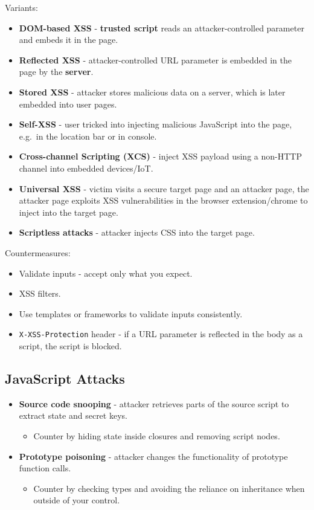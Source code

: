 \documentclass[11pt]{article}
\begin{document}
Variants:
\begin{itemize}
  \item \textbf{DOM-based XSS} - \textbf{trusted script} reads an attacker-controlled parameter and embeds it in the page.
  \item \textbf{Reflected XSS} - attacker-controlled URL parameter is embedded in the page by the \textbf{server}.
  \item \textbf{Stored XSS} - attacker stores malicious data on a server, which is later embedded into user pages.
  \item \textbf{Self-XSS} - user tricked into injecting malicious JavaScript into the page, e.g.\ in the location bar or in console.
  \item \textbf{Cross-channel Scripting (XCS)} - inject XSS payload using a non-HTTP channel into embedded devices/IoT.
  \item \textbf{Universal XSS} - victim visits a secure target page and an attacker page, the attacker page exploits XSS vulnerabilities in the browser extension/chrome to inject into the target page.
  \item \textbf{Scriptless attacks} - attacker injects CSS into the target page.
\end{itemize}

Countermeasures:
\begin{itemize}
  \item Validate inputs - accept only what you expect.
  \item XSS filters.
  \item Use templates or frameworks to validate inputs consistently.
  \item \texttt{X-XSS-Protection} header - if a URL parameter is reflected in the body as a script, the script is blocked.
\end{itemize}

\subsection{JavaScript Attacks}
\begin{itemize}
  \item \textbf{Source code snooping} - attacker retrieves parts of the source script to extract state and secret keys.
    \begin{itemize}
      \item Counter by hiding state inside closures and removing script nodes.
    \end{itemize}
  \item \textbf{Prototype poisoning} - attacker changes the functionality of prototype function calls.
    \begin{itemize}
      \item Counter by checking types and avoiding the reliance on inheritance when outside of your control.
    \end{itemize}
\end{itemize}
\end{document}
